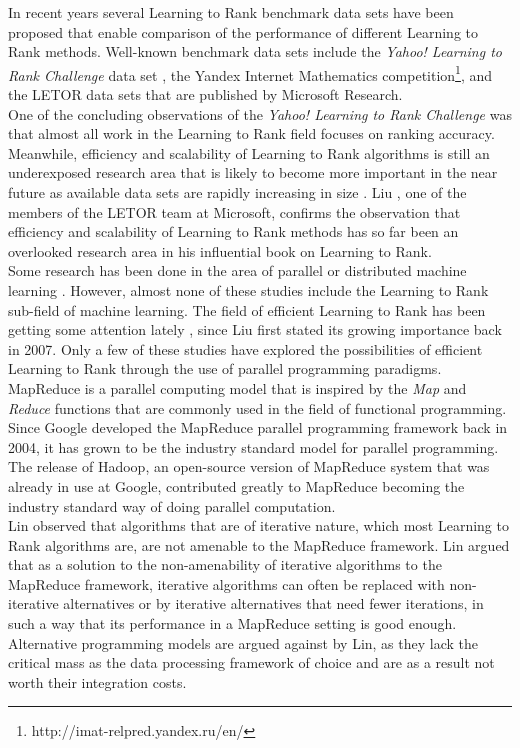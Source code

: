 In recent years several Learning to Rank benchmark data sets have been proposed that enable comparison of the performance of different Learning to Rank methods. Well-known benchmark data sets include the \emph{Yahoo! Learning to Rank Challenge} data set \cite{Chapelle2011a}, the Yandex Internet Mathematics competition\footnote{http://imat-relpred.yandex.ru/en/}, and the LETOR data sets \cite{Qin2010} that are published by Microsoft Research.\\

One of the concluding observations of the \emph{Yahoo! Learning to Rank Challenge} was that almost all work in the Learning to Rank field focuses on ranking accuracy. Meanwhile, efficiency and scalability of Learning to Rank algorithms is still an underexposed research area that is likely to become more important in the near future as available data sets are rapidly increasing in size \cite{Chapelle2011b}. Liu \cite{Liu2007}, one of the members of the LETOR team at Microsoft, confirms the observation that efficiency and scalability of Learning to Rank methods has so far been an overlooked research area in his influential book on Learning to Rank.\\

Some research has been done in the area of parallel or distributed machine learning \cite{Chu2007,Chang2007}. However, almost none of these studies include the Learning to Rank sub-field of machine learning. The field of efficient Learning to Rank has been getting some attention lately \cite{Asadi2013a,Asadi2013b,Busa-Fekete2012,Sousa2012,Shukla2012}, since Liu \cite{Liu2007} first stated its growing importance back in 2007. Only a few of these studies \cite{Sousa2012,Shukla2012} have explored the possibilities of efficient Learning to Rank through the use of parallel programming paradigms.\\

MapReduce \cite{Dean2004} is a parallel computing model that is inspired by the \emph{Map} and \emph{Reduce} functions that are commonly used in the field of functional programming. Since Google developed the MapReduce parallel programming framework back in 2004, it has grown to be the industry standard model for parallel programming. The release of Hadoop, an open-source version of MapReduce system that was already in use at Google, contributed greatly to MapReduce becoming the industry standard way of doing parallel computation.\\

Lin \cite{Lin2013} observed that algorithms that are of iterative nature, which most Learning to Rank algorithms are, are not amenable to the MapReduce framework. Lin argued that as a solution to the non-amenability of iterative algorithms to the MapReduce framework, iterative algorithms can often be replaced with non-iterative alternatives or by iterative alternatives that need fewer iterations, in such a way that its performance in a MapReduce setting is good enough. Alternative programming models are argued against by Lin, as they lack the critical mass as the data processing framework of choice and are as a result not worth their integration costs.\\

